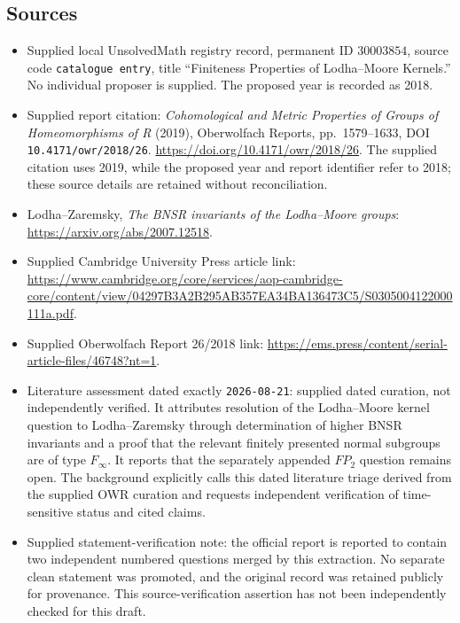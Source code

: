 \documentclass[11pt]{article}
\begin{document}
\subsection{Sources}
\begin{itemize}
\item Supplied local UnsolvedMath registry record, permanent ID \(30003854\), source code \texttt{catalogue entry}, title ``Finiteness Properties of Lodha--Moore Kernels.'' No individual proposer is supplied. The proposed year is recorded as 2018.
\item Supplied report citation: \emph{Cohomological and Metric Properties of Groups of Homeomorphisms of R} (2019), Oberwolfach Reports, pp.~1579--1633, DOI \texttt{10.4171/owr/2018/26}. \url{https://doi.org/10.4171/owr/2018/26}. The supplied citation uses 2019, while the proposed year and report identifier refer to 2018; these source details are retained without reconciliation.
\item Lodha--Zaremsky, \emph{The BNSR invariants of the Lodha--Moore groups}: \url{https://arxiv.org/abs/2007.12518}.
\item Supplied Cambridge University Press article link: \url{https://www.cambridge.org/core/services/aop-cambridge-core/content/view/04297B3A2B295AB357EA34BA136473C5/S0305004122000111a.pdf}.
\item Supplied Oberwolfach Report 26/2018 link: \url{https://ems.press/content/serial-article-files/46748?nt=1}.
\item Literature assessment dated exactly \texttt{2026-08-21}: supplied dated curation, not independently verified. It attributes resolution of the Lodha--Moore kernel question to Lodha--Zaremsky through determination of higher BNSR invariants and a proof that the relevant finitely presented normal subgroups are of type \(F_\infty\). It reports that the separately appended \(FP_2\) question remains open. The background explicitly calls this dated literature triage derived from the supplied OWR curation and requests independent verification of time-sensitive status and cited claims.
\item Supplied statement-verification note: the official report is reported to contain two independent numbered questions merged by this extraction. No separate clean statement was promoted, and the original record was retained publicly for provenance. This source-verification assertion has not been independently checked for this draft.
\end{itemize}
\end{document}
